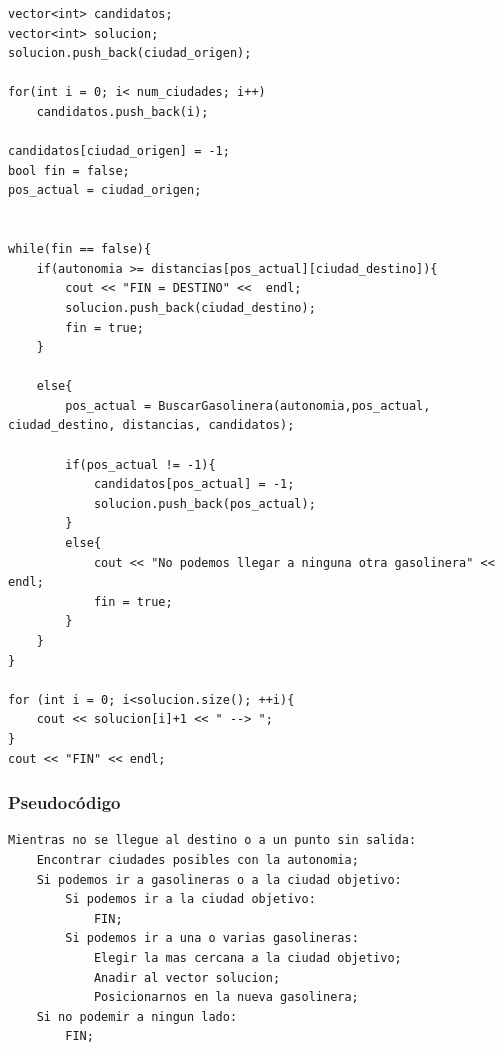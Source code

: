 \documentclass[11pt,a4paper]{article} %
\begin{document}
\begin{lstlisting}[style=C++]
vector<int> candidatos;
vector<int> solucion;
solucion.push_back(ciudad_origen);

for(int i = 0; i< num_ciudades; i++)
	candidatos.push_back(i);

candidatos[ciudad_origen] = -1;
bool fin = false;
pos_actual = ciudad_origen;


while(fin == false){
	if(autonomia >= distancias[pos_actual][ciudad_destino]){
		cout << "FIN = DESTINO" <<  endl;
		solucion.push_back(ciudad_destino);
		fin = true;
	}

	else{
		pos_actual = BuscarGasolinera(autonomia,pos_actual, ciudad_destino, distancias, candidatos);
	
		if(pos_actual != -1){
			candidatos[pos_actual] = -1;
			solucion.push_back(pos_actual);
		}
		else{
			cout << "No podemos llegar a ninguna otra gasolinera" << endl;
			fin = true;
		}
	}
}

for (int i = 0; i<solucion.size(); ++i){
	cout << solucion[i]+1 << " --> ";
}
cout << "FIN" << endl;
\end{lstlisting}

\subsubsection{Pseudocódigo}

\begin{lstlisting}
Mientras no se llegue al destino o a un punto sin salida:
	Encontrar ciudades posibles con la autonomia;
	Si podemos ir a gasolineras o a la ciudad objetivo:
		Si podemos ir a la ciudad objetivo:
			FIN;
		Si podemos ir a una o varias gasolineras:
			Elegir la mas cercana a la ciudad objetivo;
			Anadir al vector solucion;
			Posicionarnos en la nueva gasolinera;
	Si no podemir a ningun lado:
		FIN;
\end{lstlisting}
\end{document}

